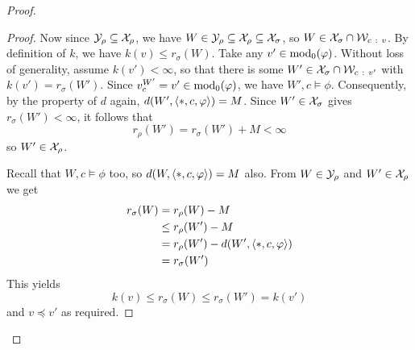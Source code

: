 \begin{proof}
\begin{proof}
            Now since $\mathcal{Y}_\rho \subseteq \mathcal{X}_\rho$, we have $W \in \mathcal{Y}_\rho
            \subseteq \mathcal{X}_\rho \subseteq \mathcal{X}_\sigma$, so $W \in \mathcal{X}_\sigma \cap
            \mathcal{W}_{c\ :\  v}$. By definition of $k$, we have $k(v) \le
            r_\sigma(W)$. Take any $v' \in \operatorname{mod}_0(\varphi)$. Without loss of
            generality, assume $k(v') < \infty$, so that there is some $W' \in
            \mathcal{X}_\sigma \cap \mathcal{W}_{c\ :\  v'}$ with $k(v') = r_\sigma(W')$. Since
            $v^{W'}_c = v' \in \operatorname{mod}_0(\varphi)$, we have $W', c \models \phi$.
            Consequently, by the property of $d$ again, $d(W', \langle {\ast, c,
            \varphi} \rangle) = M$. Since $W' \in \mathcal{X}_\sigma$ gives $r_\sigma(W') <
            \infty$, it follows that
            \[
                r_\rho(W') = r_\sigma(W') + M < \infty
            \]
            so $W' \in \mathcal{X}_\rho$.

            Recall that $W, c \models \phi$ too, so $d(W, \langle {\ast, c,
            \varphi} \rangle) = M$ also. From $W \in \mathcal{Y}_\rho$ and $W' \in \mathcal{X}_\rho$ we get
            \begin{align*}
                r_\sigma(W)
                &= r_\rho(W) - M \\
                &\le r_\rho(W') - M \\
                &= r_\rho(W') - d(W', \langle {\ast, c, \varphi} \rangle) \\
                &= r_\sigma(W')
            \end{align*}
            This yields
            \[
                k(v) \le r_\sigma(W) \le r_\sigma(W') = k(v')
            \]
            and $v \preceq v'$ as required.



\end{proof}
\end{proof}

